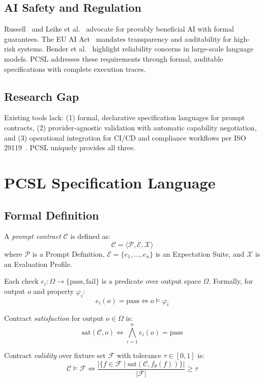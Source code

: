 \documentclass[sigconf]{acmart}
\begin{document}
\subsection{AI Safety and Regulation}

Russell~\cite{russell2019human} and Leike et al.~\cite{leike2018rewardmodeling} advocate for provably beneficial AI with formal guarantees. The EU AI Act~\cite{euaiact2024} mandates transparency and auditability for high-risk systems. Bender et al.~\cite{bender2021stochasticparrots} highlight reliability concerns in large-scale language models. PCSL addresses these requirements through formal, auditable specifications with complete execution traces.

\subsection{Research Gap}

Existing tools lack: (1) formal, declarative specification languages for prompt contracts, (2) provider-agnostic validation with automatic capability negotiation, and (3) operational integration for CI/CD and compliance workflows per ISO 29119~\cite{iso29119}. PCSL uniquely provides all three.

\section{PCSL Specification Language}

\subsection{Formal Definition}

A \textit{prompt contract} \( \mathcal{C} \) is defined as:
\[
\mathcal{C} = \langle \mathcal{P}, \mathcal{E}, \mathcal{X} \rangle
\]
where \( \mathcal{P} \) is a Prompt Definition, \( \mathcal{E} = \{e_1, \ldots, e_n\} \) is an Expectation Suite, and \( \mathcal{X} \) is an Evaluation Profile.

Each check \( e_i: \Omega \to \{\text{pass}, \text{fail}\} \) is a predicate over output space \( \Omega \). Formally, for output \( o \) and property \( \varphi_i \):
\[
e_i(o) = \text{pass} \iff o \models \varphi_i
\]

Contract \textit{satisfaction} for output \( o \in \Omega \) is:
\[
\text{sat}(\mathcal{C}, o) \iff \bigwedge_{i=1}^{n} e_i(o) = \text{pass}
\]

Contract \textit{validity} over fixture set \( \mathcal{F} \) with tolerance \( \tau \in [0,1] \) is:
\[
\mathcal{C} \models \mathcal{F} \iff \frac{|\{f \in \mathcal{F} \mid \text{sat}(\mathcal{C}, f_\theta(f))\}|}{|\mathcal{F}|} \geq \tau
\]
\end{document}
